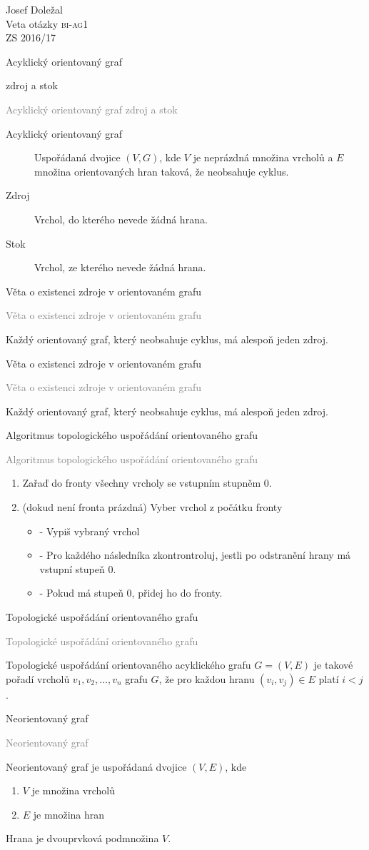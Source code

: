\documentclass[20pt]{extarticle}
\newcommand{\card}[3][]{
	\vspace*{\fill}

	\newpage
	\topskip0pt
	\vspace*{\fill}
		\Large #2

		\vspace{1cm}
		\normalsize #1
	\vspace*{\fill}
	\newpage

	\small \textcolor{gray}{#2 #1}
	\topskip0pt
	\vspace*{\fill}

	\normalsize
	#3
	\vspace*{\fill}
}
\newcommand{\pair}[2]{\left(#1, #2\right)}
\begin{document}
\begin{center}

\vspace*{\fill}
\Large Josef Doležal\\[1cm]
\normalsize Veta otázky \textsc{bi-ag1}\\
\normalsize ZS 2016/17
\normalsize

\card[zdroj a stok]{Acyklický orientovaný graf}{
	\begin{description}
		\item[Acyklický orientovaný graf] Uspořádaná dvojice $\pair{V}{G}$, kde $V$
		je neprázdná množina vrcholů a $E$ množina orientovaných hran taková, že neobsahuje cyklus.
		\item[Zdroj] Vrchol, do kterého nevede žádná hrana.
		\item[Stok] Vrchol, ze kterého nevede žádná hrana.
	\end{description}
}

\card{Věta o existenci zdroje v orientovaném grafu}{
  Každý orientovaný graf, který neobsahuje cyklus, má alespoň jeden zdroj.
}

\card{Věta o existenci zdroje v orientovaném grafu}{
  Každý orientovaný graf, který neobsahuje cyklus, má alespoň jeden zdroj.
}

\card{Algoritmus topologického uspořádání orientovaného grafu}{
  \small
  \begin{enumerate}
    \item Zařaď do fronty všechny vrcholy se vstupním stupněm 0.
    \item (dokud není fronta prázdná) Vyber vrchol z počátku fronty
		\begin{itemize}
			\item - Vypiš vybraný vrchol
			\item - Pro každého následníka zkontrontroluj, jestli po odstranění hrany má vstupní stupeň 0.
			\item - Pokud má stupeň 0, přidej ho do fronty.
		\end{itemize}
  \end{enumerate}
	\normalsize
}

\card{Topologické uspořádání orientovaného grafu}{
  Topologické uspořádání orientovaného acyklického grafu $G = \pair{V}{E}$ je takové pořadí vrcholů $v_1, v_2, \dots, v_n$ grafu $G$,
  že pro každou hranu $\pair{v_i}{v_j} \in E$ platí $i < j$.
}

\card{Neorientovaný graf}{
  Neorientovaný graf je uspořádaná dvojice $\pair{V}{E}$, kde
  \begin{enumerate}
    \item $V$ je množina vrcholů
    \item $E$ je množina hran
  \end{enumerate}
  Hrana je dvouprvková podmnožina $V$.
}


\end{center}
\end{document}
